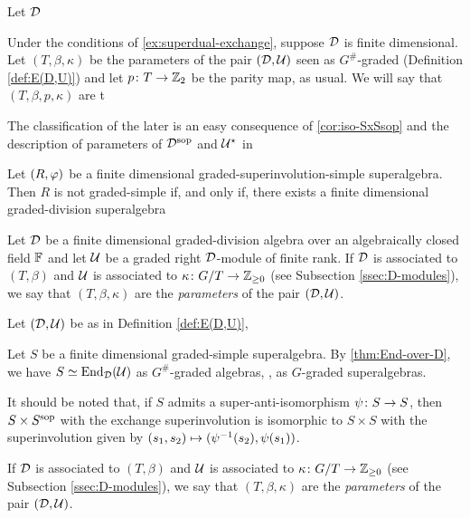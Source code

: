 \begin{cor}
    Let $\mathcal{D}$
\end{cor}

\begin{defi}
    Under the conditions of \cref{ex:superdual-exchange}, suppose $\mathcal{D}$ is finite dimensional. 
    Let $(T, \beta, \kappa)$ be the parameters of the pair $(\mathcal{D}, \mathcal U)$ seen as $G^\#$-graded (Definition \ref{def:E(D,U)}) and let $p\colon T \to \mathbb{Z}_2$ be the parity map, as usual. 
    We will say that $(T, \beta, p, \kappa)$ are t
\end{defi}

The classification of the later is an easy consequence of 
\cref{cor:iso-SxSsop} and the description of parameters of $\mathcal{D}^{\mathrm{sop}}$ and $\mathcal U^\star$ in 


\begin{cor}\label{cor:iso-graded-simple-double}
    Let $(R, \varphi)$ be a finite dimensional graded-superinvolution-simple superalgebra. 
    Then $R$ is not graded-simple if, and only if, there exists a finite dimensional graded-division superalgebra 
    
\end{cor}



    Let $\mathcal{D}$ be a finite dimensional graded-division algebra over an algebraically closed field $\mathbb{F}$ and let $\mathcal U$ be a graded right $\mathcal{D}$-module of finite rank. 
	If $\mathcal{D}$ is associated to $(T, \beta)$ and $\mathcal U$ is associated to $\kappa\colon G/T \to \mathbb{Z}_{\geq 0}$ (see Subsection \ref{ssec:D-modules}), we say that $(T, \beta, \kappa)$ are the \emph{parameters} of the pair $(\mathcal{D}, \mathcal U)$.

\begin{prop}
    Let $(\mathcal{D}, \mathcal U)$ be as in Definition \ref{def:E(D,U)}, 
\end{prop}


Let $S$ be a finite dimensional graded-simple superalgebra. 
By \cref{thm:End-over-D}, we have $S \simeq \operatorname{End}_{\mathcal{D}} (\mathcal U)$ as $G^\#$-graded algebras, \ie, as $G$-graded superalgebras. 





It should be noted that, if $S$ admits a super-anti-isomorphism $\psi\colon S \to S$, then $S\times S^{\mathrm{sop}}$ with the exchange superinvolution is isomorphic to $S\times S$ with the superinvolution given by $(s_1, s_2) \mapsto (\psi^{-1} (s_2), \psi (s_1))$.

\begin{defi}\label{def:E(D,U)-exchange}
     
	If $\mathcal{D}$ is associated to $(T, \beta)$ and $\mathcal U$ is associated to $\kappa\colon G/T \to \mathbb{Z}_{\geq 0}$ (see Subsection \ref{ssec:D-modules}), we say that $(T, \beta, \kappa)$ are the \emph{parameters} of the pair $(\mathcal{D}, \mathcal U)$.
\end{defi}

